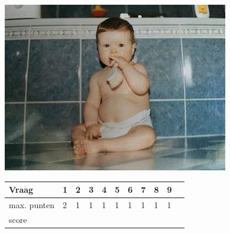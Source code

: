 \begin{questions}
{\begin{center}
{\includegraphics[scale=0.40]{elien}}
\end{center}
\begin{flushleft}
\end{flushleft} }

\end{questions}

\begin{table}[!b]
\centering
\begin{tabular}{|l|l|l|l|l|l|l|l|l|l|l|}
\hline
Vraag       & 1 & 2 & 3 & 4 & 5 & 6 & 7 & 8 & 9 \\ \hline
max. punten & 2 & 1 & 1 & 1 & 1 & 1 & 1 & 1 & 1 \\ \hline
score       &   &   &   &   &   &   &   &   &   \\ \hline
\end{tabular}
\end{table}
\newpage